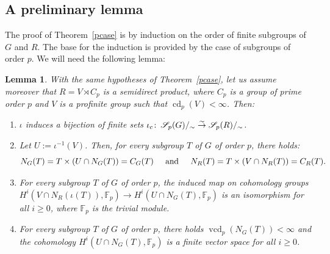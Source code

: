 \documentclass[12pt,twoside]{amsart}
\newcommand\F{{\mathbb F}}
\newcommand\sr{\stackrel}
\newcommand\cS{{\mathscr S}}
\def\co{\colon\thinspace}
\newcommand\cd{\operatorname{cd}}
\newcommand\vcd{\operatorname{vcd}}
\newtheorem{lemma}[theorem]{Lemma}
\theoremstyle{definition}
\begin{document}
\subsection{A preliminary lemma}
The proof of Theorem~\ref{pcase} is by induction on the order of finite subgroups of $G$ and $R$. The base for the induction
is provided by the case of subgroups of order $p$. We will need the following lemma:

\begin{lemma}\label{prop:prime_order}With the same hypotheses of Theorem~\ref{pcase}, let us assume moreover that $R=V\rtimes C_p$ is a 
semidirect product, where $C_p$ is a group of prime order $p$ and $V$ is a profinite group such that $\cd_p(V)<\infty$. Then:
\begin{enumerate} 
\item $\iota$ induces a bijection of finite sets $\iota_c\co\cS_p(G)/_{\sim}\sr{\sim}{\to}\cS_p(R)/_{\sim}$. 
\item Let $U:=\iota^{-1}(V)$. Then, for every subgroup $T$ of $G$ of order $p$, there holds:
\[N_G(T)=T\times(U\cap N_G(T))=C_G(T)\hspace{0.5cm}\mbox{and}\hspace{0.5cm} N_R(T)=T\times(V\cap N_R(T))=C_R(T).\]
\item For every subgroup $T$ of $G$ of order $p$, the induced map on cohomology groups $H^i (V\cap N_{R}(\iota(T)),\F_p)\to H^i(U\cap N_G(T),\F_p)$ 
is an isomorphism for all $i\geq 0$, where $\F_p$ is the trivial module. 
\item For every subgroup $T$ of $G$ of order $p$, there holds $\vcd_p(N_{G}(T))<\infty$ and the cohomology $H^i(U\cap N_G(T),\F_p)$
is a finite vector space for all $i\geq 0$.
\end{enumerate}
\end{lemma}
\end{document}
